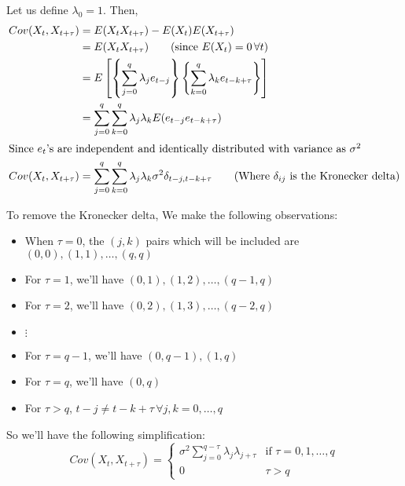\documentclass[12pt, oneside]{article}
\begin{document}
\begin{enumerate}
{    Let us define \(\lambda_0 = 1\). Then,
    \begin{align*}
        Cov(X_t, X_{t+\tau}) &= E(X_t X_{t+\tau}) - E(X_t)E(X_{t+\tau}) \\
            &= E(X_t X_{t+\tau}) \tag*{(since \(E(X_t) = 0 \,\forall t\))} \\
            &= E\left[\left\{\sum_{j=0}^{q}\lambda_j e_{t-j}\right\}\left\{\sum_{k=0}^{q}\lambda_k e_{t-k+\tau}\right\}\right] \\
            &= \sum_{j=0}^{q} \sum_{k=0}^{q} \lambda_j \lambda_k E(e_{t-j} e_{t-k+\tau}) \\
        \intertext{Since \(e_t\)'s are independent and identically distributed with variance as
        \(\sigma^2\)}
        Cov(X_t, X_{t+\tau}) &= \sum_{j=0}^{q} \sum_{k=0}^{q} \lambda_j \lambda_k \sigma^2 \delta_{t-j,t-k+\tau}
            \tag*{(Where \(\delta_{ij}\) is the Kronecker delta)}
    \end{align*}

    To remove the Kronecker delta, We make the following observations:
    \begin{itemize}
        \item When \(\tau = 0\), the \((j, k)\) pairs which will be included are \((0, 0), (1, 1), \ldots, (q, q)\)
        \item For \(\tau = 1\), we'll have \((0, 1), (1, 2), \ldots, (q-1, q)\)
        \item For \(\tau = 2\), we'll have \((0, 2), (1, 3), \ldots, (q-2, q)\)
        \item \(\vdots\)
        \item For \(\tau = q-1\), we'll have \((0, q-1), (1, q)\)
        \item For \(\tau = q\), we'll have \((0, q)\)
        \item For \(\tau > q\), \(t - j \neq t - k + \tau \,\forall j, k = 0, \ldots, q\)
    \end{itemize}

    So we'll have the following simplification:
    \begin{equation}
        Cov(X_t, X_{t+\tau}) = \begin{cases}
            \sigma^2 \sum_{j=0}^{q-\tau} \lambda_j \lambda_{j+\tau} & \text{if } \tau = 0, 1, \ldots, q \\
            0 & \tau > q
        \end{cases}
    \end{equation}

}
\end{enumerate}
\end{document}
